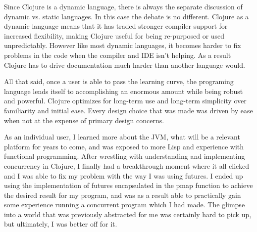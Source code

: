     Since Clojure is a dynamic language, there is always the separate discussion of dynamic vs. static languages. In this case the debate is no different. Clojure as a dynamic language means that it has traded stronger compiler support for increased flexibility, making Clojure useful for being re-purposed or used unpredictably. However like most dynamic languages, it becomes harder to fix problems in the code when the compiler and IDE isn't helping. As a result Clojure has to drive documentation much harder than another language would. 
    
    All that said, once a user is able to pass the learning curve, the programing language lends itself to accomplishing an enormous amount while being robust and powerful. Clojure optimizes for long-term use and long-term simplicity over familiarity and initial ease. Every design choice that was made was driven by ease when not at the expense of primary design concerns.
    
    As an individual user, I learned more about the JVM, what will be a relevant platform for years to come, and was exposed to more Lisp and experience with functional programming. After wrestling with understanding and implementing concurrency in Clojure, I finally had a breakthrough moment where it all clicked and I was able to fix my problem with the way I was using futures. I ended up using the implementation of futures encapsulated in the pmap function to achieve the desired result for my program, and was as a result able to practically gain some experience running a concurrent program which I had made. The glimpse into a world that was previously abstracted for me was certainly hard to pick up, but ultimately, I was better off for it.
